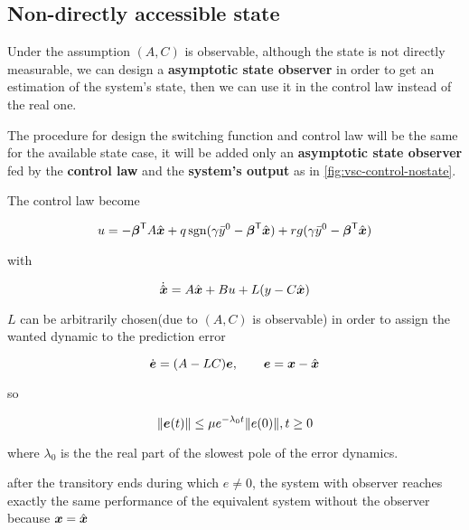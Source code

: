 \subsection{Non-directly accessible state}

Under the assumption $(A,C)$ is observable, although the state is not directly measurable, we can design a \textbf{asymptotic state observer} in order to get an estimation of the system's state, then we can use it in the control law instead of the real one.

The procedure for design the switching function and control law will be the same for the available state case, it will be added only an \textbf{asymptotic state observer} fed by the \textbf{control law} and the \textbf{system's output} as in \cref{fig:vsc-control-nostate}.

The control law become

\[
    u = - \boldsymbol{\beta}^{\mathsf{T}} A \hat{\boldsymbol{x}} + q \operatorname{sgn}(\gamma \bar y^0 - \boldsymbol{\beta}^{\mathsf{T}} \hat{\boldsymbol{x}}) + r g(\gamma \bar y^0 - \boldsymbol{\beta}^{\mathsf{T}} \hat{\boldsymbol{x}})
\]

with

\[
    \dot{\hat{\boldsymbol{x}}} = A\hat{\boldsymbol{x}} + Bu + L(y - C\hat{\boldsymbol{x}})
\]

$L$ can be arbitrarily chosen(due to $(A,C)$ is observable) in order to assign the wanted dynamic to the prediction error

\[
    \dot{\boldsymbol{e}} = (A - LC) \boldsymbol{e}, \qquad \boldsymbol{e} = \boldsymbol{x} - \hat{\boldsymbol{x}}
\]

so

\[
    \lVert\boldsymbol{e}(t)\rVert \leq \mu e^{-\lambda_0 t}\lVert e(0)\rVert, t \geq 0
\]

where $\lambda_0$ is the the real part of the slowest pole of the error dynamics.

\begin{nb}after the transitory ends during which $e\ne 0$, the system with observer reaches exactly the same performance of the equivalent system without the observer because $\boldsymbol{x} = \hat{\boldsymbol{x}}$\end{nb}

